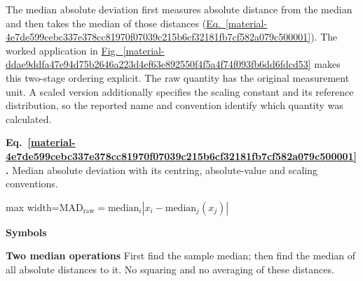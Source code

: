 \documentclass[11pt,a4paper]{article}
\begin{document}
\medskip

The median absolute deviation first measures absolute distance from the median and then takes the median of those distances (\hyperref[material-4e7de599cebc337e378cc81970f07039c215b6cf32181fb7cf582a079c500001]{Eq.~\ref*{material-4e7de599cebc337e378cc81970f07039c215b6cf32181fb7cf582a079c500001}}). The worked application in \hyperref[material-ddae9ddfa47e94d75b2646a223d4ef63e892550f4f5a4f74f093fb6dd6fdcd53]{Fig.~\ref*{material-ddae9ddfa47e94d75b2646a223d4ef63e892550f4f5a4f74f093fb6dd6fdcd53}} makes this two-stage ordering explicit. The raw quantity has the original measurement unit. A scaled version additionally specifies the scaling constant and its reference distribution, so the reported name and convention identify which quantity was calculated.


\par\medskip
\noindent\begin{minipage}{\linewidth}
\label{material-4e7de599cebc337e378cc81970f07039c215b6cf32181fb7cf582a079c500001}
\noindent\textbf{Eq.~\ref*{material-4e7de599cebc337e378cc81970f07039c215b6cf32181fb7cf582a079c500001}.} Median absolute deviation with its centring, absolute-value and scaling conventions.\par\nopagebreak
\begin{center}\begin{adjustbox}{max width=\linewidth}$\displaystyle \mathrm{MAD}_{\mathrm{raw}}=\mathrm{median}_i\left|x_i-\mathrm{median}_j(x_j)\right|$\end{adjustbox}\end{center}

\par\noindent\textbf{Symbols}

\par\noindent\textbf{Two median operations} First find the sample median; then find the median of all absolute distances to it. No squaring and no averaging of these distances.

\end{minipage}\par
\medskip
\end{document}
